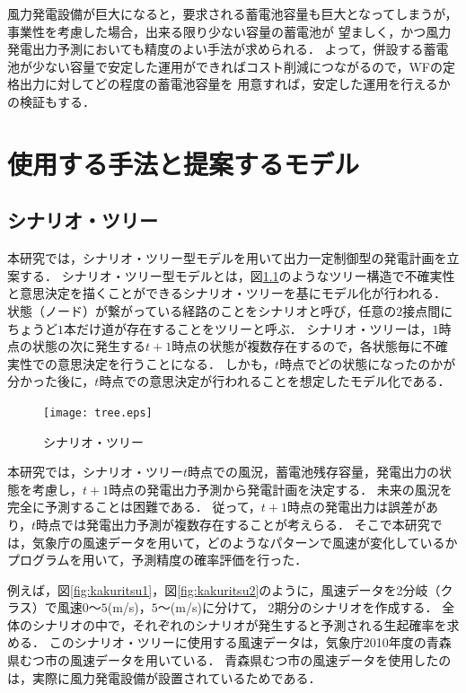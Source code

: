 \documentclass[a4paper,12pt,showkeys]{jreport}
\begin{document}
風力発電設備が巨大になると，要求される蓄電池容量も巨大となってしまうが，事業性を考慮した場合，出来る限り少ない容量の蓄電池が
望ましく，かつ風力発電出力予測においても精度のよい手法が求められる．
よって，併設する蓄電池が少ない容量で安定した運用ができればコスト削減につながるので，WFの定格出力に対してどの程度の蓄電池容量を
用意すれば，安定した運用を行えるかの検証もする．


\chapter{使用する手法と提案するモデル}
\label{model}
\section{シナリオ・ツリー}

本研究では，シナリオ・ツリー型モデルを用いて出力一定制御型の発電計画を立案する．
シナリオ・ツリー型モデルとは，図\ref{fig:tree}のようなツリー構造で不確実性と意思決定を描くことができるシナリオ・ツリーを基にモデル化が行われる．
状態（ノード）が繋がっている経路のことをシナリオと呼び，任意の$2$接点間にちょうど$1$本だけ道が存在することをツリーと呼ぶ．
シナリオ・ツリーは，$1$時点の状態の次に発生する$t+1$時点の状態が複数存在するので，各状態毎に不確実性での意思決定を行うことになる．
しかも，$t$時点でどの状態になったのかが分かった後に，$t$時点での意思決定が行われることを想定したモデル化である\cite{シナリオ}．

\begin{figure}[h]
\centering
\texttt{[image: tree.eps]}
\caption{シナリオ・ツリー}
\label{fig:tree}
\end{figure}

本研究では，シナリオ・ツリー$t$時点での風況，蓄電池残存容量，発電出力の状態を考慮し，$t+1$時点の発電出力予測から発電計画を決定する．
未来の風況を完全に予測することは困難である．
従って，$t+1$時点の発電出力は誤差があり，$t$時点では発電出力予測が複数存在することが考えらる．
そこで本研究では，気象庁の風速データを用いて，どのようなパターンで風速が変化しているかプログラムを用いて，予測精度の確率評価を行った．

例えば，図\ref{fig:kakuritsu1}，図\ref{fig:kakuritsu2}のように，風速データを2分岐（クラス）で風速$0$～$5$(m/s)，$5$～(m/s)に分けて，
2期分のシナリオを作成する．
全体のシナリオの中で，それぞれのシナリオが発生すると予測される生起確率を求める．
このシナリオ・ツリーに使用する風速データは，気象庁2010年度の青森県むつ市の風速データを用いている．
青森県むつ市の風速データを使用したのは，実際に風力発電設備が設置されているためである．
\end{document}
